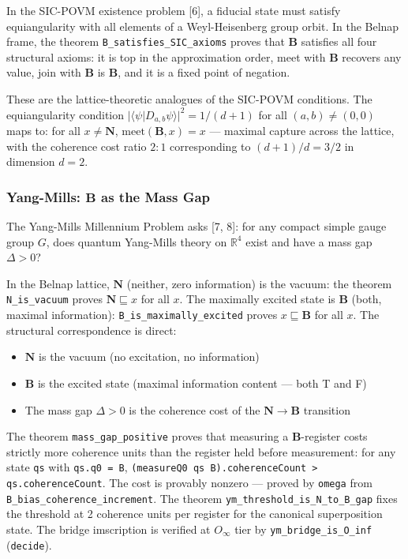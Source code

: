 \documentclass[10pt,a4paper]{article}
\begin{document}
In the SIC-POVM existence problem {[}6{]}, a fiducial state must satisfy equiangularity with all elements of a Weyl-Heisenberg group orbit. In the Belnap frame, the theorem \texttt{B\_\allowbreak satisfies\_\allowbreak SIC\_\allowbreak axioms} proves that $\mathbf{B}$ satisfies all four structural axioms: it is top in the approximation order, meet with $\mathbf{B}$ recovers any value, join with $\mathbf{B}$ is $\mathbf{B}$, and it is a fixed point of negation.

These are the lattice-theoretic analogues of the SIC-POVM conditions. The equiangularity condition $|\langle \psi | D_{a,b} \psi \rangle|^2 = 1/(d+1)$ for all $(a,b) \neq (0,0)$ maps to: for all $x \neq \mathbf{N}$, $\text{meet}(\mathbf{B}, x) = x$ --- maximal capture across the lattice, with the coherence cost ratio $2:1$ corresponding to $(d+1)/d = 3/2$ in dimension $d=2$.

\subsubsection{Yang-Mills: $\mathbf{B}$ as the Mass Gap}

The Yang-Mills Millennium Problem asks {[}7, 8{]}: for any compact simple gauge group $G$, does quantum Yang-Mills theory on $\mathbb{R}^4$ exist and have a mass gap $\Delta > 0$?

In the Belnap lattice, $\mathbf{N}$ (neither, zero information) is the vacuum: the theorem \texttt{N\_\allowbreak is\_\allowbreak vacuum} proves $\mathbf{N} \sqsubseteq x$ for all $x$. The maximally excited state is $\mathbf{B}$ (both, maximal information): \texttt{B\_\allowbreak is\_\allowbreak maximally\_\allowbreak excited} proves $x \sqsubseteq \mathbf{B}$ for all $x$. The structural correspondence is direct:

\begin{itemize}
    \item $\mathbf{N}$ is the vacuum (no excitation, no information)
    \item $\mathbf{B}$ is the excited state (maximal information content --- both T and F)
    \item The mass gap $\Delta > 0$ is the coherence cost of the $\mathbf{N} \to \mathbf{B}$ transition
\end{itemize}

The theorem \texttt{mass\_\allowbreak gap\_\allowbreak positive} proves that measuring a $\mathbf{B}$-register costs strictly more coherence units than the register held before measurement: for any state \texttt{qs} with \texttt{qs.\allowbreak q0 = B}, \texttt{(measureQ0 qs B).\allowbreak coherenceCount \textgreater{} qs.\allowbreak coherenceCount}. The cost is provably nonzero --- proved by \texttt{omega} from \texttt{B\_\allowbreak bias\_\allowbreak coherence\_\allowbreak increment}. The theorem \texttt{ym\_\allowbreak threshold\_\allowbreak is\_\allowbreak N\_\allowbreak to\_\allowbreak B\_\allowbreak gap} fixes the threshold at 2 coherence units per register for the canonical superposition state. The bridge imscription is verified at $O_{\infty}$ tier by \texttt{ym\_\allowbreak bridge\_\allowbreak is\_\allowbreak O\_\allowbreak inf} (\texttt{decide}).
\end{document}
